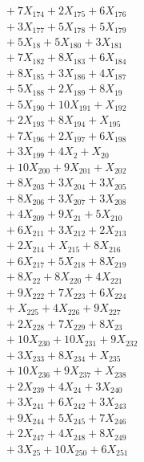 \documentclass[a4paper,10pt]{article}
\begin{document}
{\begin{align}
&\quad  + 7X_{174} + 2X_{175} + 6X_{176} \\[0.5ex]
&\quad  + 3X_{177} + 5X_{178} + 5X_{179} \\[0.5ex]
&\quad  + 5X_{18} + 5X_{180} + 3X_{181} \\[0.5ex]
&\quad  + 7X_{182} + 8X_{183} + 6X_{184} \\[0.5ex]
&\quad  + 8X_{185} + 3X_{186} + 4X_{187} \\[0.5ex]
&\quad  + 5X_{188} + 2X_{189} + 8X_{19} \\[0.5ex]
&\quad  + 5X_{190} + 10X_{191} + X_{192} \\[0.5ex]
&\quad  + 2X_{193} + 8X_{194} + X_{195} \\[0.5ex]
&\quad  + 7X_{196} + 2X_{197} + 6X_{198} \\[0.5ex]
&\quad  + 3X_{199} + 4X_{2} + X_{20} \\[0.5ex]
&\quad  + 10X_{200} + 9X_{201} + X_{202} \\[0.5ex]
&\quad  + 8X_{203} + 3X_{204} + 3X_{205} \\[0.5ex]
&\quad  + 8X_{206} + 3X_{207} + 3X_{208} \\[0.5ex]
&\quad  + 4X_{209} + 9X_{21} + 5X_{210} \\[0.5ex]
&\quad  + 6X_{211} + 3X_{212} + 2X_{213} \\[0.5ex]
&\quad  + 2X_{214} + X_{215} + 8X_{216} \\[0.5ex]
&\quad  + 6X_{217} + 5X_{218} + 8X_{219} \\[0.5ex]
&\quad  + 8X_{22} + 8X_{220} + 4X_{221} \\[0.5ex]
&\quad  + 9X_{222} + 7X_{223} + 6X_{224} \\[0.5ex]
&\quad  + X_{225} + 4X_{226} + 9X_{227} \\[0.5ex]
&\quad  + 2X_{228} + 7X_{229} + 8X_{23} \\[0.5ex]
&\quad  + 10X_{230} + 10X_{231} + 9X_{232} \\[0.5ex]
&\quad  + 3X_{233} + 8X_{234} + X_{235} \\[0.5ex]
&\quad  + 10X_{236} + 9X_{237} + X_{238} \\[0.5ex]
&\quad  + 2X_{239} + 4X_{24} + 3X_{240} \\[0.5ex]
&\quad  + 3X_{241} + 6X_{242} + 3X_{243} \\[0.5ex]
&\quad  + 9X_{244} + 5X_{245} + 7X_{246} \\[0.5ex]
&\quad  + 2X_{247} + 4X_{248} + 8X_{249} \\[0.5ex]
&\quad  + 3X_{25} + 10X_{250} + 6X_{251} \\[0.5ex]

\end{align}}
\end{document}

